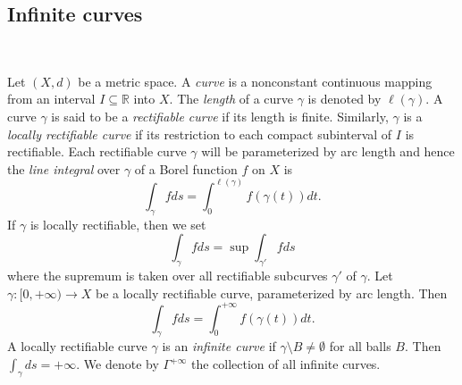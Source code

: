 \documentclass[10pt]{amsart}
\numberwithin{equation}{section}
\begin{document}
\subsection{Infinite curves}\label{sec-polar}\ 

Let $(X,d)$ be a metric space. A  \textit{curve} is a nonconstant continuous mapping from an interval $I\subseteq\mathbb R$ into $X$. The \textit{length} of a curve $\gamma$ is denoted by $\ell(\gamma)$. A curve $\gamma$ is said to be a  \textit{rectifiable curve} if its length is finite. Similarly, $\gamma$ is a   \textit{locally rectifiable curve} if its restriction to each compact subinterval of $I$ is rectifiable. Each rectifiable curve $\gamma$ will be parameterized by arc length and hence the  \textit{line integral} over $\gamma$ of a Borel function $f$ on $X$ is 
\[\int_\gamma fds =\int_0^{\ell(\gamma)}f(\gamma(t))dt.
\]
If $\gamma$ is locally rectifiable, then we set 
\[\int_{\gamma}fds=\sup\int_{\gamma'}fds
\]where the supremum is taken over all rectifiable subcurves $\gamma'$ of $\gamma$. Let $\gamma:[0,{+\infty})\to X$ be a locally rectifiable curve, parameterized by arc length. Then
\[\int_{\gamma}fds=\int_0^{+\infty} f(\gamma(t))dt.
\]
A locally rectifiable curve $\gamma$ is an  \textit{infinite curve} if $\gamma\setminus B\neq\emptyset$ for all balls $B$. Then $\int_{\gamma}ds={+\infty}.$   
 We denote by $\Gamma^{+\infty}$ the collection of all infinite curves.
\end{document}
